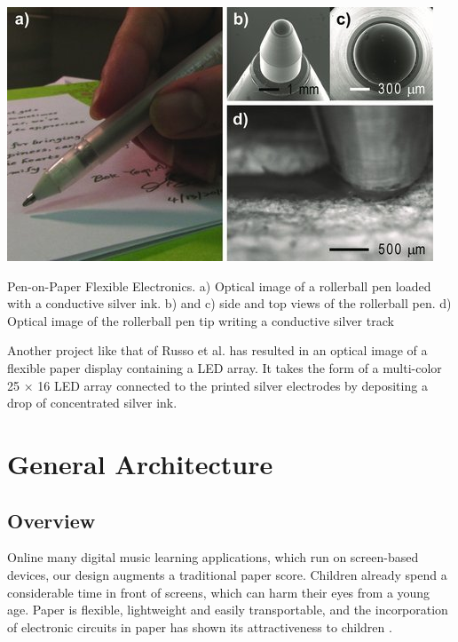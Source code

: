 \begin{marginfigure}
    \centering
    \includegraphics{images/IS_pen-on-paper.jpg}
    \caption{Pen-on-Paper Flexible Electronics. a) Optical image of a rollerball pen loaded with a conductive silver ink. b) and c) side and top views of the rollerball pen. d) Optical image of the rollerball pen tip writing a conductive silver track}
    \label{fig:IS_pen-on-paper}
\end{marginfigure}

Another project like that of Russo et al. \cite{IS_pen-on-paper} has resulted in an optical image of a flexible paper display containing a LED array. It takes the form of a multi-color 25 × 16 LED array connected to the printed silver electrodes by depositing a drop of concentrated silver ink.

\section{General Architecture}

\subsection{Overview}

Online many digital music learning applications, which run on screen-based devices,
our design augments a traditional paper score. Children already spend a considerable
time in front of screens, which can harm their eyes from a young age. Paper is flexible,
lightweight and easily transportable, and the incorporation of electronic circuits in
paper has shown its attractiveness to children
\cite{hershman2018light}.

